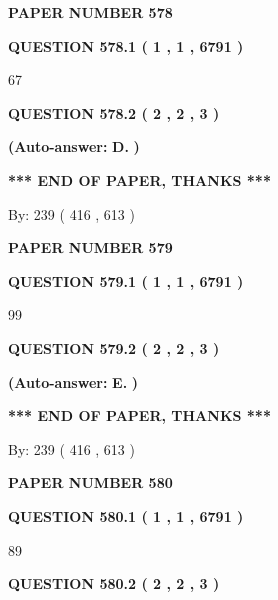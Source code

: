 \documentclass[12pt]{article}
\begin{document}
   
\newpage 
\setcounter{page}{ 
   578001 } 
   
   
 {\textbf{ \Large{ PAPER NUMBER  578  }}}
   
   
   
   
  
  
{\textbf{\large{QUESTION
578.1 
 ( 1 , 1 , 6791 )
}}}

67
  
  
{\textbf{\large{QUESTION
578.2 
 ( 2 , 2 , 3 )
}}}
 
 
{\textbf{(Auto-answer:}}
{\textbf{\large{
D.}}}
{\textbf{)}}
 
 
   
   
   
   
\vspace{1.0in} 
{\textbf{\large{ *** END OF PAPER, THANKS *** }}} 
   
   
\hspace{1.0in} By: 
 239 ( 416 ,  613 )
   
   
   
   
\newpage 
\setcounter{page}{ 
   579001 } 
   
   
 {\textbf{ \Large{ PAPER NUMBER  579  }}}
   
   
   
   
  
  
{\textbf{\large{QUESTION
579.1 
 ( 1 , 1 , 6791 )
}}}

99
  
  
{\textbf{\large{QUESTION
579.2 
 ( 2 , 2 , 3 )
}}}
 
 
{\textbf{(Auto-answer:}}
{\textbf{\large{
E.}}}
{\textbf{)}}
 
 
   
   
   
   
\vspace{1.0in} 
{\textbf{\large{ *** END OF PAPER, THANKS *** }}} 
   
   
\hspace{1.0in} By: 
 239 ( 416 ,  613 )
   
   
   
   
\newpage 
\setcounter{page}{ 
   580001 } 
   
   
 {\textbf{ \Large{ PAPER NUMBER  580  }}}
   
   
   
   
  
  
{\textbf{\large{QUESTION
580.1 
 ( 1 , 1 , 6791 )
}}}

89
  
  
{\textbf{\large{QUESTION
580.2 
 ( 2 , 2 , 3 )
}}}
 
\end{document}
